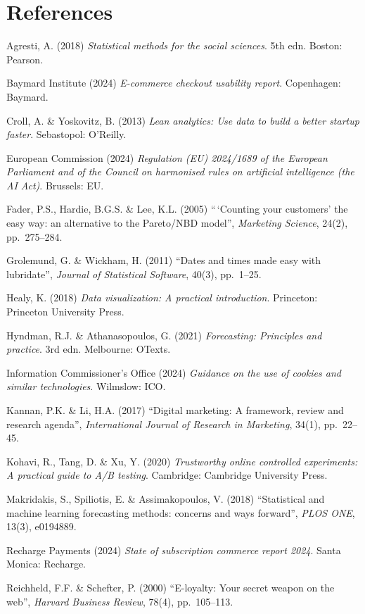 \documentclass[
  11pt,
]{article}
\begin{document}
\newpage

\section{References}\label{references}

Agresti, A. (2018) \emph{Statistical methods for the social sciences}.
5th edn. Boston: Pearson.

Baymard Institute (2024) \emph{E-commerce checkout usability report}.
Copenhagen: Baymard.

Croll, A. \& Yoskovitz, B. (2013) \emph{Lean analytics: Use data to
build a better startup faster}. Sebastopol: O'Reilly.

European Commission (2024) \emph{Regulation (EU) 2024/1689 of the
European Parliament and of the Council on harmonised rules on artificial
intelligence (the AI Act)}. Brussels: EU.

Fader, P.S., Hardie, B.G.S. \& Lee, K.L. (2005) ``\,`Counting your
customers' the easy way: an alternative to the Pareto/NBD model'',
\emph{Marketing Science}, 24(2), pp.~275--284.

Grolemund, G. \& Wickham, H. (2011) ``Dates and times made easy with
lubridate'', \emph{Journal of Statistical Software}, 40(3), pp.~1--25.

Healy, K. (2018) \emph{Data visualization: A practical introduction}.
Princeton: Princeton University Press.

Hyndman, R.J. \& Athanasopoulos, G. (2021) \emph{Forecasting: Principles
and practice}. 3rd edn. Melbourne: OTexts.

Information Commissioner's Office (2024) \emph{Guidance on the use of
cookies and similar technologies}. Wilmslow: ICO.

Kannan, P.K. \& Li, H.A. (2017) ``Digital marketing: A framework, review
and research agenda'', \emph{International Journal of Research in
Marketing}, 34(1), pp.~22--45.

Kohavi, R., Tang, D. \& Xu, Y. (2020) \emph{Trustworthy online
controlled experiments: A practical guide to A/B testing}. Cambridge:
Cambridge University Press.

Makridakis, S., Spiliotis, E. \& Assimakopoulos, V. (2018) ``Statistical
and machine learning forecasting methods: concerns and ways forward'',
\emph{PLOS ONE}, 13(3), e0194889.

Recharge Payments (2024) \emph{State of subscription commerce report
2024}. Santa Monica: Recharge.

Reichheld, F.F. \& Schefter, P. (2000) ``E-loyalty: Your secret weapon
on the web'', \emph{Harvard Business Review}, 78(4), pp.~105--113.
\end{document}
